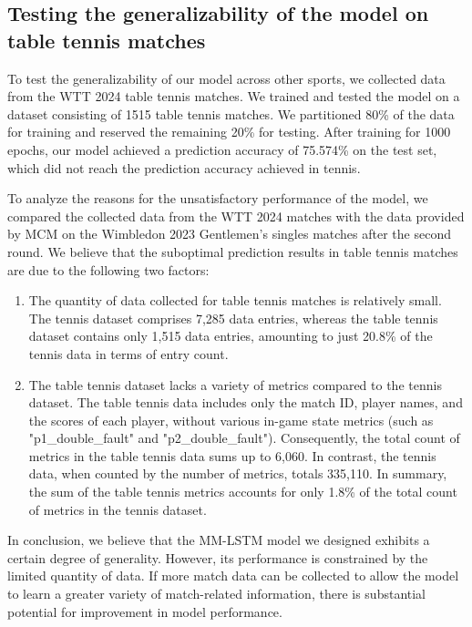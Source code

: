 \subsection{Testing the generalizability of the model on table tennis matches}
To test the generalizability of our model across other sports, we collected data from the WTT 2024 table tennis matches. We trained and tested the model on a dataset consisting of 1515 table tennis matches. We partitioned 80\% of the data for training and reserved the remaining 20\% for testing. After training for 1000 epochs, our model achieved a prediction accuracy of 75.574\% on the test set, which did not reach the prediction accuracy achieved in tennis.


To analyze the reasons for the unsatisfactory performance of the model, we compared the collected data from the WTT 2024 matches with the data provided by MCM on the Wimbledon 2023 Gentlemen’s singles matches after the second round. We believe that the suboptimal prediction results in table tennis matches are due to the following two factors:

\begin{enumerate}
    \item The quantity of data collected for table tennis matches is relatively small. The tennis dataset comprises 7,285 data entries, whereas the table tennis dataset contains only 1,515 data entries, amounting to just 20.8\% of the tennis data in terms of entry count.
    \item The table tennis dataset lacks a variety of metrics compared to the tennis dataset. The table tennis data includes only the match ID, player names, and the scores of each player, without various in-game state metrics (such as "p1\_double\_fault" and "p2\_double\_fault"). Consequently, the total count of metrics in the table tennis data sums up to 6,060. In contrast, the tennis data, when counted by the number of metrics, totals 335,110. In summary, the sum of the table tennis metrics accounts for only 1.8\% of the total count of metrics in the tennis dataset.

\end{enumerate}

In conclusion, we believe that the MM-LSTM model we designed exhibits a certain degree of generality. However, its performance is constrained by the limited quantity of data. If more match data can be collected to allow the model to learn a greater variety of match-related information, there is substantial potential for improvement in model performance.
